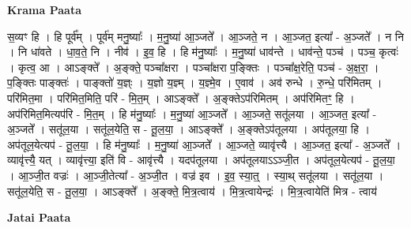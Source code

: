 \documentclass[17pt]{extarticle}
\begin{document}
\textbf{Krama Paata} \newline

स॒व्यꣳ हि । हि पूर्व᳚म् । पूर्व॑म् मनु॒ष्याः᳚ । म॒नु॒ष्या॑ आ॒ञ्जते᳚ । आ॒ञ्जते॒ न । आ॒ञ्जत॒ इत्या᳚ - अ॒ञ्जते᳚ । न नि । नि धा॑वते । धा॒व॒ते॒ नि । नीव॑ । इ॒व॒ हि । हि म॑नु॒ष्याः᳚ । म॒नु॒ष्या॑ धाव॑न्ते । धाव॑न्ते॒ पञ्च॑ । पञ्च॒ कृत्वः॑ । कृत्व॒ आ । आऽङ्‍क्ते᳚ । अ॒ङ्‍क्ते॒ पञ्चा᳚क्षरा । पञ्चा᳚क्षरा प॒ङ्‍क्तिः । पञ्चा᳚क्ष॒रेति॒ पञ्च॑ - अ॒क्ष॒रा॒ । प॒ङ्‍क्तिः पाङ्‍क्तः॑ । पाङ्‍क्तो॑ य॒ज्ञ्ः । य॒ज्ञो य॒ज्ञ्म् । य॒ज्ञ्मे॒व । ए॒वाव॑ । अव॑ रुन्धे । रु॒न्धे॒ परि॑मितम् । परि॑मित॒मा । परि॑मित॒मिति॒ परि॑ - मि॒त॒म् । आऽङ्‍क्ते᳚ । अ॒ङ्‍क्तेऽप॑रिमितम् । अप॑रिमितꣳ॒॒ हि । अप॑रिमित॒मित्यप॑रि - मि॒त॒म् । हि म॑नु॒ष्याः᳚ । म॒नु॒ष्या॑ आ॒ञ्जते᳚ । आ॒ञ्जते॒ सतू॑लया । आ॒ञ्जत॒ इत्या᳚ - अ॒ञ्जते᳚ । सतू॑ल॒या । सतू॑ल॒येति॒ स - तू॒ल॒या॒ । आऽङ्‍क्ते᳚ । अ॒ङ्‍क्तेऽप॑तूलया । अप॑तूलया॒ हि । अप॑तूल॒येत्यप॑ - तू॒ल॒या॒ । हि म॑नु॒ष्याः᳚ । म॒नु॒ष्या॑ आ॒ञ्जते᳚ । आ॒ञ्जते॒ व्यावृ॑त्त्यै । आ॒ञ्जत॒ इत्या᳚ - अ॒ञ्जते᳚ । व्यावृ॑त्त्यै॒ यत् । व्यावृ॑त्त्या॒ इति॑ वि - आवृ॑त्त्यै । यदप॑तूलया । अप॑तूलयाऽऽञ्जी॒त । अप॑तूल॒येत्यप॑ - तू॒ल॒या॒ । आ॒ञ्जी॒त वज्रः॑ । आ॒ञ्जी॒तेत्या᳚ - अ॒ञ्जी॒त । वज्र॑ इव । इ॒व॒ स्या॒त्॒ । स्या॒थ् सतू॑लया । सतू॑ल॒या । सतू॑ल॒येति॒ स - तू॒ल॒या॒ । आऽङ्‍क्ते᳚ । अ॒ङ्‍क्ते॒ मि॒त्र॒त्वाय॑ । मि॒त्र॒त्वायेन्द्रः॑ । मि॒त्र॒त्वायेति॑ मित्र - त्वाय॑ \newline

\textbf{Jatai Paata} \newline
\end{document}
